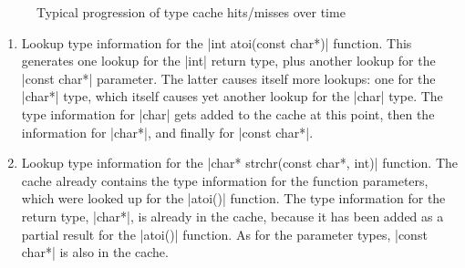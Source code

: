 \begin{figure}[thH]
  \centering
  \caption{Typical progression of type cache hits/misses over time}
  \label{fig:plot-type-cache-hitmiss}
\end{figure}

\begin{enumerate}

  \item Lookup type information for the \Mc|int atoi(const char*)| function.
  This generates one lookup for the \Mc|int| return type, plus another lookup
  for the \Mc|const char*| parameter. The latter causes itself more lookups:
  one for the \Mc|char*| type, which itself causes yet another lookup for the
  \Mc|char| type. The type information for \Mc|char| gets added to the
  cache at this point, then the information for \Mc|char*|, and finally for
  \Mc|const char*|.

  \item Lookup type information for the \Mc|char* strchr(const char*, int)|
  function. The cache already contains the type information for the function
  parameters, which were looked up for the \Mc|atoi()| function. The type
  information for the return type, \Mc|char*|, is already in the cache,
  because it has been added as a partial result for the \Mc|atoi()|
  function. As for the parameter types, \Mc|const char*| is also
  in the cache.

\end{enumerate}

